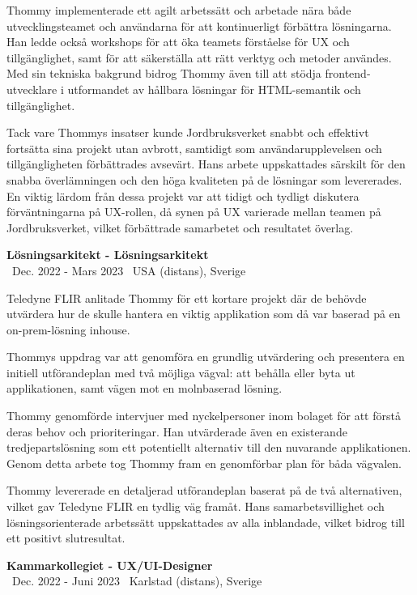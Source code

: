 \documentclass[a4paper,10pt]{article}
\begin{document}
Thommy implementerade ett agilt arbetssätt och arbetade nära både utvecklingsteamet och användarna för att kontinuerligt förbättra lösningarna. Han ledde också workshops för att öka teamets förståelse för UX och tillgänglighet, samt för att säkerställa att rätt verktyg och metoder användes. Med sin tekniska bakgrund bidrog Thommy även till att stödja frontend-utvecklare i utformandet av hållbara lösningar för HTML-semantik och tillgänglighet.

Tack vare Thommys insatser kunde Jordbruksverket snabbt och effektivt fortsätta sina projekt utan avbrott, samtidigt som användarupplevelsen och tillgängligheten förbättrades avsevärt. Hans arbete uppskattades särskilt för den snabba överlämningen och den höga kvaliteten på de lösningar som levererades. En viktig lärdom från dessa projekt var att tidigt och tydligt diskutera förväntningarna på UX-rollen, då synen på UX varierade mellan teamen på Jordbruksverket, vilket förbättrade samarbetet och resultatet överlag.

\vspace{0.5cm}
\textbf{Lösningsarkitekt - Lösningsarkitekt}\\
\normalsize \faCalendar \ Dec. 2022 - Mars 2023 \quad \faMapMarker \ USA (distans), Sverige

Teledyne FLIR anlitade Thommy för ett kortare projekt där de behövde utvärdera hur de skulle hantera en viktig applikation som då var baserad på en on-prem-lösning inhouse.

Thommys uppdrag var att genomföra en grundlig utvärdering och presentera en initiell utförandeplan med två möjliga vägval: att behålla eller byta ut applikationen, samt vägen mot en molnbaserad lösning.

Thommy genomförde intervjuer med nyckelpersoner inom bolaget för att förstå deras behov och prioriteringar. Han utvärderade även en existerande tredjepartslösning som ett potentiellt alternativ till den nuvarande applikationen. Genom detta arbete tog Thommy fram en genomförbar plan för båda vägvalen.

Thommy levererade en detaljerad utförandeplan baserat på de två alternativen, vilket gav Teledyne FLIR en tydlig väg framåt. Hans samarbetsvillighet och lösningsorienterade arbetssätt uppskattades av alla inblandade, vilket bidrog till ett positivt slutresultat.

\vspace{0.5cm}
\textbf{Kammarkollegiet - UX/UI-Designer}\\
\normalsize \faCalendar \ Dec. 2022 - Juni 2023 \quad \faMapMarker \ Karlstad (distans), Sverige
\end{document}
